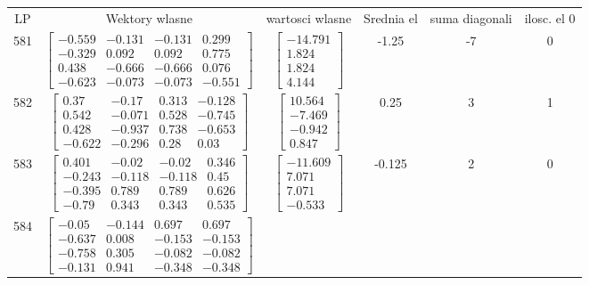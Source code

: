 \documentclass[a4paper,12pt]{article}
\begin{document}
\bgroup {} \vspace{0.2in} \begin{tabular}{c c c c c c}
LP &Wektory wlasne & wartosci wlasne & Srednia el & suma diagonali & ilosc. el 0\\
581
&
$\begin{bmatrix} -0.559 & -0.131 & -0.131 & 0.299 \\ -0.329 & 0.092 & 0.092 & 0.775 \\ 0.438 & -0.666 & -0.666 & 0.076 \\ -0.623 & -0.073 & -0.073 & -0.551 \end{bmatrix}$
&
$\begin{bmatrix} -14.791 \\ 1.824 \\ 1.824 \\ 4.144 \end{bmatrix}$
&
-1.25
&
-7
&
0
\\
582
&
$\begin{bmatrix} 0.37 & -0.17 & 0.313 & -0.128 \\ 0.542 & -0.071 & 0.528 & -0.745 \\ 0.428 & -0.937 & 0.738 & -0.653 \\ -0.622 & -0.296 & 0.28 & 0.03 \end{bmatrix}$
&
$\begin{bmatrix} 10.564 \\ -7.469 \\ -0.942 \\ 0.847 \end{bmatrix}$
&
0.25
&
3
&
1
\\
583
&
$\begin{bmatrix} 0.401 & -0.02 & -0.02 & 0.346 \\ -0.243 & -0.118 & -0.118 & 0.45 \\ -0.395 & 0.789 & 0.789 & 0.626 \\ -0.79 & 0.343 & 0.343 & 0.535 \end{bmatrix}$
&
$\begin{bmatrix} -11.609 \\ 7.071 \\ 7.071 \\ -0.533 \end{bmatrix}$
&
-0.125
&
2
&
0
\\
584
&
$\begin{bmatrix} -0.05 & -0.144 & 0.697 & 0.697 \\ -0.637 & 0.008 & -0.153 & -0.153 \\ -0.758 & 0.305 & -0.082 & -0.082 \\ -0.131 & 0.941 & -0.348 & -0.348 \end{bmatrix}$

\end{tabular}
\end{document}
